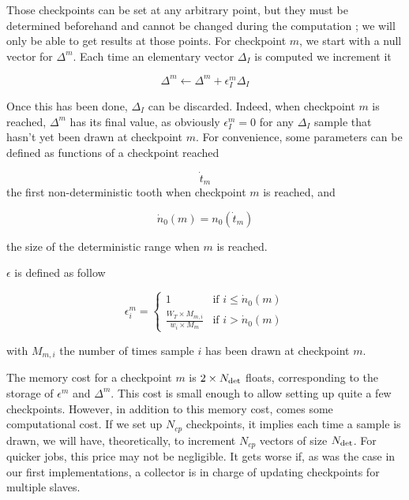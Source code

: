 \documentclass[./thesis.tex]{subfiles}
\begin{document}
Those checkpoints can be set at any arbitrary point, but they must be determined beforehand and cannot be changed during the computation ; we will only be able to get results at those points.
For checkpoint $m$, we start with a null vector for $\Delta^m$. Each time an elementary vector $\Delta_I$ is computed
we increment it 



\begin{equation}
\Delta^m \gets \Delta^m + \epsilon_I^{m} \Delta_I
\end{equation}


Once this has been done, $\Delta_I$ can be discarded. Indeed, when checkpoint $m$ is reached, $\Delta^{m}$ has its final value, as obviously $\epsilon_I^{m} = 0$ for any $\Delta_I$ sample that hasn't yet been drawn at checkpoint ${m}$.
For convenience, some parameters can be defined as functions of a checkpoint reached

\begin{equation}
\dot t_m
\end{equation}
the first non-deterministic tooth when checkpoint $m$ is reached, and

\begin{equation}
\dot n_0(m) = n_0(\dot t_m)
\end{equation}

the size of the deterministic range when $m$ is reached.


$\epsilon$ is defined as follow

\begin{equation}
\epsilon^m_i = 
\begin{cases}
1 & \text{if } i \leq \dot n_0(m) \\
\frac{W_T \times M_{m,i}}{w_i \times M_m} & \text{if } i > \dot n_0(m)
\end{cases}
\end{equation}


with $M_{m,i}$ the number of times sample $i$ has been drawn at checkpoint $m$.


The memory cost for a checkpoint $m$ is $2 \times {N_\text{det}}$ floats, corresponding to the storage of $\epsilon^m$ and $\Delta^m$. This cost is small enough to allow setting up quite a few checkpoints. However, in addition to this memory cost, comes some computational cost. If we set up $N_{cp}$ checkpoints, it implies each time a sample is drawn, we will have, theoretically, to increment $N_{cp}$ vectors of size ${N_\text{det}}$. For quicker jobs, this price may not be negligible. It gets worse if, as was the case in our first implementations, a collector is in charge of updating checkpoints for multiple slaves. 
\end{document}
